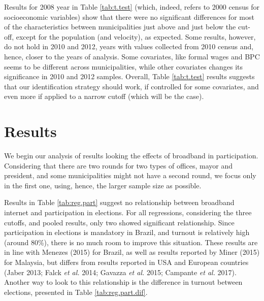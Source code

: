 \documentclass[
  12pt,
]{article}
\begin{document}
Results for 2008 year in Table \ref{tab:t.test} (which, indeed, refers
to 2000 census for socioeconomic variables) show that there were no
significant differences for most of the characteristics between
municipalities just above and just below the cut-off, except for the
population (and velocity), as expected. Some results, however, do not
hold in 2010 and 2012, years with values collected from 2010 census and,
hence, closer to the years of analysis. Some covariates, like formal
wages and BPC seems to be different across municipalities, while other
covariates changes its significance in 2010 and 2012 samples. Overall,
Table \ref{tab:t.test} results suggests that our identification strategy
should work, if controlled for some covariates, and even more if applied
to a narrow cutoff (which will be the case).

\hypertarget{results}{%
\section{Results}\label{results}}

We begin our analysis of results looking the effects of broadband in
participation. Considering that there are two rounds for two types of
offices, mayor and president, and some municipalities might not have a
second round, we focus only in the first one, using, hence, the larger
sample size as possible.

Results in Table \ref{tab:reg.part} suggest no relationship between
broadband internet and participation in elections. For all regressions,
considering the three cutoffs, and pooled results, only two showed
significant relationship. Since participation in elections is mandatory
in Brazil, and turnout is relatively high (around 80\%), there is no
much room to improve this situation. These results are in line with
Menezes (2015) for Brazil, as well as results reported by Miner (2015)
for Malaysia, but differs from results reported in USA and European
countries (Jaber 2013; Falck \emph{et al.} 2014; Gavazza \emph{et al.}
2015; Campante \emph{et al.} 2017). Another way to look to this
relationship is the difference in turnout between elections, presented
in Table \ref{tab:reg.part.dif}.
\end{document}
